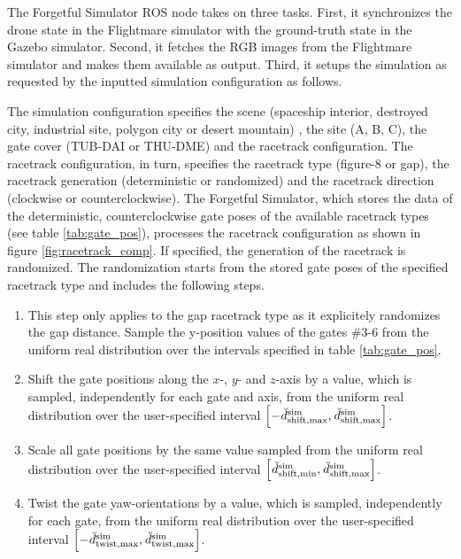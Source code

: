 The Forgetful Simulator ROS node takes on three tasks.
First, it synchronizes the
drone state in the Flightmare simulator with the
ground-truth state in the Gazebo simulator.
Second, it fetches the RGB images from the Flightmare simulator
and makes them available as output.
Third, it setups the simulation
as requested by the inputted 
simulation configuration as follows.

The simulation configuration specifies the scene
(spaceship interior,
destroyed city,
industrial site,
polygon city or
desert mountain)
, the site (A, B, C),
the gate cover (TUB-DAI or THU-DME) and the racetrack configuration.
The racetrack configuration, in turn, specifies 
the racetrack type (figure-8 or gap), the racetrack generation (deterministic or randomized) 
and the racetrack direction (clockwise or counterclockwise).
The Forgetful Simulator, 
which stores the data of the deterministic, 
counterclockwise gate poses
of the available racetrack types (see table \ref{tab:gate_pos}), 
processes the racetrack configuration as shown in figure
\ref{fig:racetrack_comp}.
If specified,
the generation of the racetrack is randomized.
The randomization starts from 
the stored gate poses of the specified racetrack type
and includes the following steps.
\begin{enumerate}
    \item This step only applies to the gap racetrack type
    as it explicitely randomizes the gap distance.
    Sample the y-position values 
    of the gates \#3-6 from the uniform real distribution
    over the intervals specified in table \ref{tab:gate_pos}.
    
    \item Shift the gate positions along the $x$-, $y$- and $z$-axis
    by a value, which is sampled, 
    independently for each gate and axis, 
    from the uniform real distribution
    over the user-specified interval 
    $\left[
        -\dist[\user]{\text{sim}}{\text{shift},\mxm}{}{},
        \dist[\user]{\text{sim}}{\text{shift},\mxm}{}{}\right]$.
    
        \item Scale all gate positions by the same value
    sampled from the uniform real distribution
    over the user-specified interval
    $\left[
        \dist[\user]{\text{sim}}{\text{shift},\mnm}{}{}, 
        \dist[\user]{\text{sim}}{\text{shift},\mxm}{}{}\right]$.
    \item Twist the gate yaw-orientations
    by a value, which is sampled, 
    independently for each gate, 
    from the uniform real distribution
    over the user-specified interval
    $\left[
        -\dist[\user]{\text{sim}}{\text{twist},\mxm}{}{},
        \dist[\user]{\text{sim}}{\text{twist},\mxm}{}{}\right]$.
\end{enumerate}

